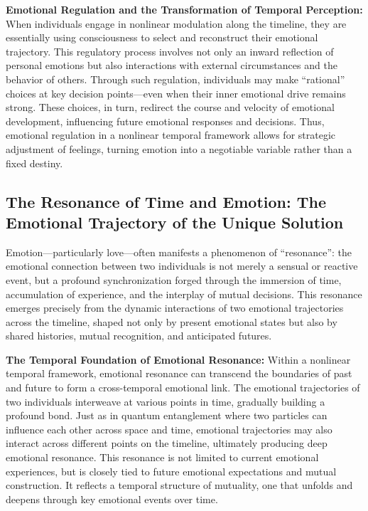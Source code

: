 \documentclass[12pt]{article}
\begin{document}
\textbf{Emotional Regulation and the Transformation of Temporal Perception:} When individuals engage in nonlinear modulation along the timeline, they are essentially using consciousness to select and reconstruct their emotional trajectory. This regulatory process involves not only an inward reflection of personal emotions but also interactions with external circumstances and the behavior of others. Through such regulation, individuals may make ``rational'' choices at key decision points—even when their inner emotional drive remains strong. These choices, in turn, redirect the course and velocity of emotional development, influencing future emotional responses and decisions. Thus, emotional regulation in a nonlinear temporal framework allows for strategic adjustment of feelings, turning emotion into a negotiable variable rather than a fixed destiny.

\subsection{The Resonance of Time and Emotion: The Emotional Trajectory of the Unique Solution}

Emotion—particularly love—often manifests a phenomenon of ``resonance'': the emotional connection between two individuals is not merely a sensual or reactive event, but a profound synchronization forged through the immersion of time, accumulation of experience, and the interplay of mutual decisions. This resonance emerges precisely from the dynamic interactions of two emotional trajectories across the timeline, shaped not only by present emotional states but also by shared histories, mutual recognition, and anticipated futures.

\textbf{The Temporal Foundation of Emotional Resonance:} Within a nonlinear temporal framework, emotional resonance can transcend the boundaries of past and future to form a cross-temporal emotional link. The emotional trajectories of two individuals interweave at various points in time, gradually building a profound bond. Just as in quantum entanglement where two particles can influence each other across space and time, emotional trajectories may also interact across different points on the timeline, ultimately producing deep emotional resonance. This resonance is not limited to current emotional experiences, but is closely tied to future emotional expectations and mutual construction. It reflects a temporal structure of mutuality, one that unfolds and deepens through key emotional events over time.
\end{document}
